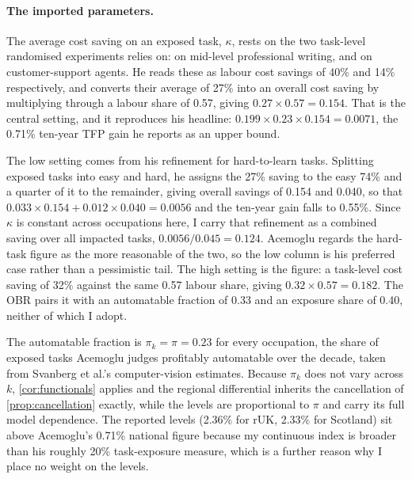\paragraph{The imported parameters.}
The average cost saving on an exposed task, $\kappa$, rests on the two task-level randomised experiments \citet{acemoglu2025} relies on: \citet{noy2023} on mid-level professional writing, and \citet{brynjolfsson2025} on customer-support agents. He reads these as labour cost savings of 40\% and 14\% respectively, and converts their average of 27\% into an overall cost saving by multiplying through a labour share of 0.57, giving $0.27 \times 0.57 = 0.154$. That is the central setting, and it reproduces his headline: $0.199 \times 0.23 \times 0.154 = 0.0071$, the 0.71\% ten-year TFP gain he reports as an upper bound. 

The low setting comes from his refinement for hard-to-learn tasks. Splitting exposed tasks into easy and hard, he assigns the 27\% saving to the easy 74\% and a quarter of it to the remainder, giving overall savings of 0.154 and 0.040, so that $0.033 \times 0.154 + 0.012 \times 0.040 = 0.0056$ and the ten-year gain falls to 0.55\%. Since $\kappa$ is constant across occupations here, I carry that refinement as a combined saving over all impacted tasks, $0.0056 / 0.045 = 0.124$. Acemoglu regards the hard-task figure as the more reasonable of the two, so the low column is his preferred case rather than a pessimistic tail. The high setting is the \citet{obr2025} figure: a task-level cost saving of 32\% against the same 0.57 labour share, giving $0.32 \times 0.57 = 0.182$. The OBR pairs it with an automatable fraction of 0.33 and an exposure share of 0.40, neither of which I adopt.

The automatable fraction is $\pi_k = \pi = 0.23$ for every occupation, the share of exposed tasks Acemoglu judges profitably automatable over the decade, taken from Svanberg et al.'s computer-vision estimates. Because $\pi_k$ does not vary across $k$, \cref{cor:functionals} applies and the regional differential inherits the cancellation of \cref{prop:cancellation} exactly, while the levels are proportional to $\pi$ and carry its full model dependence. The reported levels (2.36\% for rUK, 2.33\% for Scotland) sit above Acemoglu's 0.71\% national figure because my continuous index is broader than his roughly 20\% task-exposure measure, which is a further reason why I place no weight on the levels.

